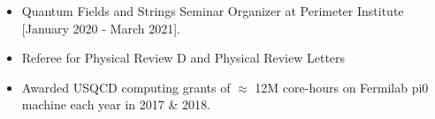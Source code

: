 \renewcommand{\arraystretch}{1.1}

	\begin{itemize}
	 \item Quantum Fields and Strings Seminar Organizer at Perimeter Institute [January 2020 - March 2021].
	  \item Referee for Physical Review D and Physical Review Letters %
	  \item Awarded USQCD computing grants of $\approx$ 12M core-hours on Fermilab pi0 machine each year in 2017 \& 2018. 
	  \end{itemize}
